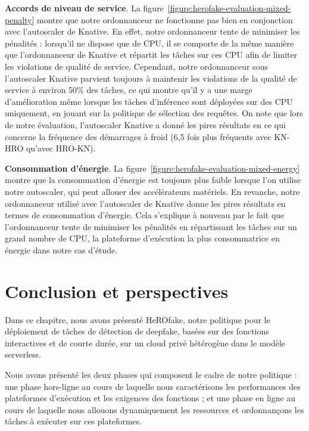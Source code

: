 \textbf{Accords de niveau de service}. La figure~\ref{figure:herofake-evaluation-mixed-penalty} montre que notre ordonnanceur ne fonctionne pas bien en conjonction avec l'autoscaler de Knative. En effet, notre ordonnanceur tente de minimiser les pénalités : lorsqu'il ne dispose que de \gls{CPU}, il se comporte de la même manière que l'ordonnanceur de Knative et répartit les tâches sur ces \gls{CPU} afin de limiter les violations de qualité de service. Cependant, notre ordonnanceur sous l'autoscaler Knative parvient toujours à maintenir les violations de la qualité de service à environ 50\% des tâches, ce qui montre qu'il y a une marge d'amélioration même lorsque les tâches d'inférence sont déployées sur des \gls{CPU} uniquement, en jouant sur la politique de sélection des requêtes. On note que lors de notre évaluation, l'autoscaler Knative a donné les pires résultats en ce qui concerne la fréquence des démarrages à froid (6,5 fois plus fréquents avec KN-HRO qu'avec HRO-KN).

\textbf{Consommation d'énergie}. La figure~\ref{figure:herofake-evaluation-mixed-energy} montre que la consommation d'énergie est toujours plus faible lorsque l'on utilise notre autoscaler, qui peut allouer des accélérateurs matériels. En revanche, notre ordonnanceur utilisé avec l'autoscaler de Knative donne les pires résultats en termes de consommation d'énergie. Cela s'explique à nouveau par le fait que l'ordonnanceur tente de minimiser les pénalités en répartissant les tâches sur un grand nombre de \gls{CPU}, la plateforme d'exécution la plus consommatrice en énergie dans notre cas d'étude.

\section{Conclusion et perspectives}
\label{section:herofake-conclusion}

Dans ce chapitre, nous avons présenté HeROfake, notre politique pour le déploiement de tâches de détection de deepfake, basées sur des fonctions interactives et de courte durée, sur un cloud privé hétérogène dans le modèle serverless.

Nous avons présenté les deux phases qui composent le cadre de notre politique : une phase hors-ligne au cours de laquelle nous caractérisons les performances des plateformes d'exécution et les exigences des fonctions ; et une phase en ligne au cours de laquelle nous allouons dynamiquement les ressources et ordonnançons les tâches à exécuter sur ces plateformes.

